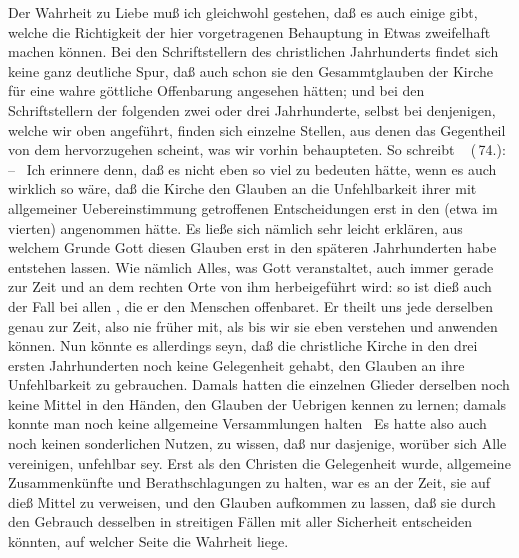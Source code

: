 \begin{RWanm}
Der Wahrheit zu Liebe muß ich gleichwohl gestehen, daß es auch einige  gibt, welche die Richtigkeit der hier vorgetragenen Behauptung in Etwas zweifelhaft machen können. Bei den Schriftstellern des  christlichen Jahrhunderts findet sich keine ganz deutliche Spur, daß auch schon sie den Gesammtglauben der Kirche für eine wahre göttliche Offenbarung angesehen hätten; und bei den Schriftstellern der folgenden zwei oder drei Jahrhunderte, selbst bei denjenigen, welche wir oben angeführt, finden sich einzelne Stellen, aus denen das Gegentheil von dem hervorzugehen scheint, was wir vorhin behaupteten. So schreibt \zB\  (\,74.):  --  \usw\ Ich erinnere denn, daß es nicht eben so viel zu bedeuten hätte, wenn es auch wirklich so wäre, daß die Kirche den Glauben an die Unfehlbarkeit ihrer mit allgemeiner Uebereinstimmung getroffenen Entscheidungen erst in den  (etwa im vierten) angenommen hätte. Es ließe sich nämlich sehr leicht erklären, aus welchem Grunde Gott diesen Glauben erst in den späteren Jahrhunderten habe entstehen lassen. Wie nämlich Alles, was Gott veranstaltet, auch immer gerade zur  Zeit und an dem rechten Orte von ihm herbeigeführt wird: so ist dieß auch der Fall bei allen , die er den Menschen offenbaret. Er theilt uns jede derselben genau zur  Zeit, also nie früher mit, als bis wir sie eben verstehen und anwenden können. Nun könnte es allerdings seyn, daß die christliche Kirche in den drei ersten Jahrhunderten noch keine Gelegenheit gehabt, den Glauben an ihre Unfehlbarkeit zu gebrauchen. Damals hatten die einzelnen Glieder derselben noch keine Mittel in den Händen, den Glauben der Uebrigen kennen zu lernen; damals konnte man noch keine allgemeine Versammlungen halten \usw\ Es hatte also auch noch keinen sonderlichen Nutzen, zu wissen, daß nur dasjenige, worüber sich Alle vereinigen, unfehlbar sey. Erst als den Christen die Gelegenheit wurde, allgemeine Zusammenkünfte und Berathschlagungen zu halten, war es an der Zeit, sie auf dieß Mittel zu verweisen, und den Glauben aufkommen zu lassen, daß sie durch den Gebrauch desselben in streitigen Fällen mit aller Sicherheit entscheiden könnten, auf welcher Seite die Wahrheit liege.
\end{RWanm}


